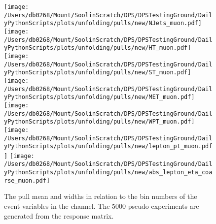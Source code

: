 \begin{figure*}[hp]
	\centering
	\texttt{[image: /Users/db0268/Mount/SoolinScratch/DPS/DPSTestingGround/DailyPythonScripts/plots/unfolding/pulls/new/NJets\_muon.pdf]} 
	\texttt{[image: /Users/db0268/Mount/SoolinScratch/DPS/DPSTestingGround/DailyPythonScripts/plots/unfolding/pulls/new/HT\_muon.pdf]} 
	\texttt{[image: /Users/db0268/Mount/SoolinScratch/DPS/DPSTestingGround/DailyPythonScripts/plots/unfolding/pulls/new/ST\_muon.pdf]} \\
	\texttt{[image: /Users/db0268/Mount/SoolinScratch/DPS/DPSTestingGround/DailyPythonScripts/plots/unfolding/pulls/new/MET\_muon.pdf]} 
	\texttt{[image: /Users/db0268/Mount/SoolinScratch/DPS/DPSTestingGround/DailyPythonScripts/plots/unfolding/pulls/new/WPT\_muon.pdf]} \\
	\texttt{[image: /Users/db0268/Mount/SoolinScratch/DPS/DPSTestingGround/DailyPythonScripts/plots/unfolding/pulls/new/lepton\_pt\_muon.pdf]} 
	\texttt{[image: /Users/db0268/Mount/SoolinScratch/DPS/DPSTestingGround/DailyPythonScripts/plots/unfolding/pulls/new/abs\_lepton\_eta\_coarse\_muon.pdf]} 
	\caption[The pull mean and widths in relation to the bin numbers of the event variables in the \muJets{} channel. The 5000 pseudo experiments are generated from the \powhegpythia{} response matrix.]{The pull mean and widths in relation to the bin numbers of the event variables in the \muJets{} channel. The 5000 pseudo experiments are generated from the \powhegpythia{} response matrix.}
	\label{fig:Pullsmu}
\end{figure*}
